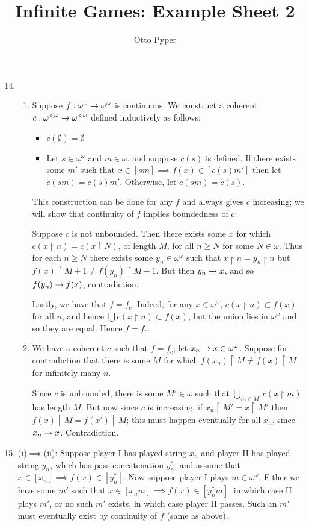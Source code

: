 \documentclass[]{article}
\title{Infinite Games: Example Sheet 2}
\author{Otto Pyper}
\date{}
\newcommand{\om}{\omega}
\newcommand{\lom}{{<\omega}}
\begin{document}
\maketitle
\begin{enumerate}[label = (\arabic*)]
\setcounter{enumi}{13}
\item \begin{enumerate}[label = (\roman*)]
    \item Suppose $f : \om^\om \ra \om^\om$ is continuous. We construct a coherent $c: \om^\lom \ra \om^\lom$ defined inductively as follows:
    \begin{itemize}
        \item $c(\emptyset) = \emptyset$
        \item Let $s \in \om^\om$ and $m \in \om$, and suppose $c(s)$ is defined. If there exists some $m'$ such that $x \in [sm] \implies f(x) \in [c(s)m']$ then let $c(sm) = c(s)m'$. Otherwise, let $c(sm) = c(s)$.
    \end{itemize}

    This construction can be done for any $f$ and always gives $c$ increasing; we will show that continuity of $f$ implies boundedness of $c$:

    Suppose $c$ is not unbounded. Then there exists some $x$ for which $c(x\restriction n) = c(x\restriction N)$, of length $M$, for all $n\ge N$ for some $N \in \om$. Thus for each $n \ge N$ there exists some $y_n \in \om^\om$ such that $x\restriction n =y_n \restriction n$ but $f(x)\restriction M+1\ne f(y_n)\restriction M+1$. But then $y_n \rightarrow x$, and so $f(y_n) \rightarrow f(x)$, contradiction.

    Lastly, we have that $f = f_c$. Indeed, for any $x \in \om^\om$, $c(x\restriction n)\subset f(x)$ for all $n$, and hence $\bigcup c(x\restriction n) \subset f(x)$, but the union lies in $\om^\om$ and so they are equal. Hence $f = f_c$.

    \item We have a coherent $c$ such that $f = f_c$; let $x_n \ra x \in \om^\om$. Suppose for contradiction that there is some $M$ for which $f(x_n)\restriction M \ne f(x) \restriction M$ for infinitely many $n$.
    
    Since $c$ is unbounded, there is some $M' \in \om$ such that $\bigcup_{m\in M'}c(x\restriction m)$ has length $M$. But now since $c$ is increasing, if $x_n \restriction M' = x\restriction M'$ then $f(x)\restriction M = f(x')\restriction M$; this must happen eventually for all $x_n$, since $x_n \rightarrow x$. Contradiction.
    \end{enumerate}
    \item \underline{(i)$\implies$(ii)}: Suppose player I has played string $x_n$ and player II has played string $y_n$, which has pass-concatenation $y_n^\ast$, and assume that $x \in [x_n] \implies f(x) \in [y_n^\ast]$. Now suppose player I plays $m \in \om^\om$. Either we have some $m'$ such that $x \in [x_nm]\implies f(x) \in [y_n^\ast m]$, in which case II plays $m'$, or no such $m'$ exists, in which case player II passes. Such an $m'$ must eventually exist by continuity of $f$ (same as above).
    

\end{enumerate}
\end{document}
